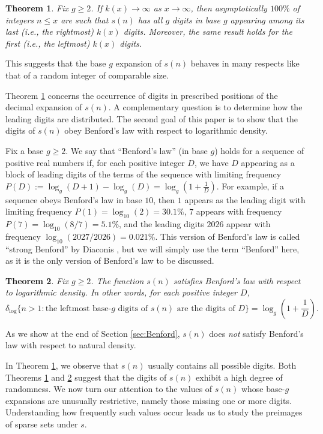 \documentclass[11pt, reqno]{amsart}
\newtheorem{theorem}{Theorem}
\theoremstyle{remark}
\numberwithin{theorem}{section}
\numberwithin{proposition}{section}
\numberwithin{lemma}{section}
\numberwithin{corollary}{section}
\numberwithin{equation}{section}
\numberwithin{conjecture}{section}
\numberwithin{definition}{section}
\begin{document}
\begin{theorem}\label{thm:firstlastk} Fix  $g\ge 2$.
 If $k(x) \to \infty$ as $x\to \infty$, then asymptotically $100\%$ of integers $n\leq x$ are such that $s(n)$ has all $g$ digits in base $g$ appearing among its last (i.e., the rightmost) $k(x)$  digits. Moreover, the same result holds for the first (i.e., the leftmost) $k(x)$ digits.
\end{theorem}

This suggests that the base $g$ expansion of $s(n)$ behaves in many respects like that of a random integer of comparable size. 

Theorem \ref{thm:firstlastk} concerns the occurrence of digits in prescribed positions of the decimal expansion of $s(n)$. A complementary question is to determine how the leading digits are distributed. The second goal of this paper is to show that the digits of $s(n)$ obey Benford's law with respect to logarithmic density.

Fix a base $g\ge 2$. We say that ``Benford's law'' (in base $g$) holds for a sequence of positive real numbers if, for each positive integer $D$, we have $D$ appearing as a block of leading digits of the terms of the sequence with limiting frequency $P(D):= \log_{g}(D+1) - \log_{g}(D) = \log_{g}(1 + \frac{1}{D})$. For example, if a sequence obeys Benford's law in base $10$, then $1$ appears as the leading digit with limiting frequency $P(1) = \log_{10}(2) = 30.1\%$, $7$ appears with frequency $P(7) = \log_{10}(8/7) = 5.1\%$, and the leading digits $2026$ appear with frequency $\log_{10}(2027/2026) = 0.021\%$. This version of Benford's law is called ``strong Benford'' by Diaconis \cite{diaconis77}, but we will simply use the term ``Benford'' here, as it is the only version of Benford's law to be discussed. 

\begin{theorem}\label{th:Benford} Fix $g\ge 2$. The function $s(n)$ satisfies Benford's law with respect to logarithmic density. In other words, for each positive integer $D$, $$\delta_{\log} \{n>1: \text{the leftmost base-$g$ digits of $s(n)$ are the digits of $D$}\} = \log_{g} \left(1 + \frac{1}{D}\right).$$
\end{theorem}

As we show at the end of Section \ref{sec:Benford}, $s(n)$ does \emph{not} satisfy Benford's law with respect to natural density.

In Theorem \ref{thm:firstlastk}, we observe that $s(n)$ usually contains all possible digits. Both Theorems \ref{thm:firstlastk} and \ref{th:Benford} suggest that the digits of $s(n)$ exhibit a high degree of randomness. We now turn our attention to the values of $s(n)$ whose base-$g$ expansions are unusually restrictive, namely those missing one or more digits. Understanding how frequently such values occur leads us to study the preimages of sparse sets under $s$.
\end{document}
